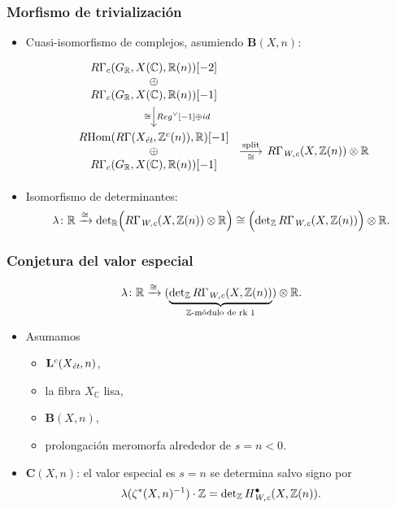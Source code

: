 \documentclass[handout]{beamer}
\newcommand{\CC}{\mathbb{C}}
\newcommand{\RR}{\mathbb{R}}
\newcommand{\ZZ}{\mathbb{Z}}
\DeclareMathOperator{\Hom}{Hom}
\newcommand{\et}{\text{\it ét}}
\newcommand{\Wc}{\text{\it W,c}}
\newcommand{\RHom}{R\!\Hom}
\begin{document}
\begin{frame}
  \frametitle{Morfismo de trivialización}

  \begin{itemize}
  \item Cuasi-isomorfismo de complejos, asumiendo $\mathbf{B} (X,n)$:
    \[ \begin{tikzcd}[column sep=4em,ampersand replacement=\&]
        \begin{array}{c} R\Gamma_c (G_\RR, X (\CC), \RR (n)) [-2] \\ \oplus \\ R\Gamma_c (G_\RR, X (\CC), \RR (n)) [-1] \end{array} \ar{d}{Reg^\vee [-1] \oplus id}[swap]{\cong} \\
        \begin{array}{c} \RHom (R\Gamma (X_\et, \ZZ^c (n)), \RR) [-1] \\ \oplus \\ R\Gamma_c (G_\RR, X (\CC), \RR (n)) [-1] \end{array} \ar{r}{\text{split}}[swap]{\cong} \&[-2em] R\Gamma_\Wc (X, \ZZ (n)) \otimes \RR
      \end{tikzcd} \]

  \item Isomorfismo de determinantes:
    \[ \lambda\colon \RR \xrightarrow{\cong}
      \det\nolimits_\RR \Bigl(R\Gamma_\Wc (X, \ZZ (n)) \otimes \RR\Bigr) \cong
      \Bigl(\det\nolimits_\ZZ R\Gamma_\Wc (X, \ZZ (n))\Bigr) \otimes \RR. \]
  \end{itemize}
\end{frame}


\begin{frame}
  \frametitle{Conjetura del valor especial}

  \[ \lambda\colon \RR \xrightarrow{\cong}
    (\underbrace{\det\nolimits_\ZZ R\Gamma_\Wc (X, \ZZ (n))}_{\ZZ\text{-módulo de rk }1}) \otimes \RR. \]

  \begin{itemize}
  \item Asumamos
    \begin{itemize}
    \item $\mathbf{L}^c (X_\et, n)$,
    \item la fibra $X_\CC$ lisa,
    \item $\mathbf{B} (X,n)$,
    \item prolongación meromorfa alrededor de $s = n < 0$.
    \end{itemize}

  \item $\mathbf{C} (X,n)$: el valor especial es $s = n$ se determina salvo
    signo por
    \[ \lambda (\zeta^* (X,n)^{-1})\cdot \ZZ = \det\nolimits_\ZZ H^\bullet_\Wc (X, \ZZ (n)). \]
  \end{itemize}
\end{frame}
\end{document}
